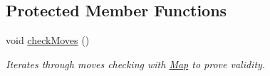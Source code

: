 \subsection*{Protected Member Functions}
\begin{DoxyCompactItemize}
\item 
\hypertarget{classapplication_1_1_piece_a70d0ea8dfe2d8ebaf1af52f3468cf972}{void \hyperlink{classapplication_1_1_piece_a70d0ea8dfe2d8ebaf1af52f3468cf972}{check\+Moves} ()}\label{classapplication_1_1_piece_a70d0ea8dfe2d8ebaf1af52f3468cf972}

\begin{DoxyCompactList}\small\item\em Iterates through moves checking with \hyperlink{classapplication_1_1_map}{Map} to prove validity. \end{DoxyCompactList}\end{DoxyCompactItemize}
